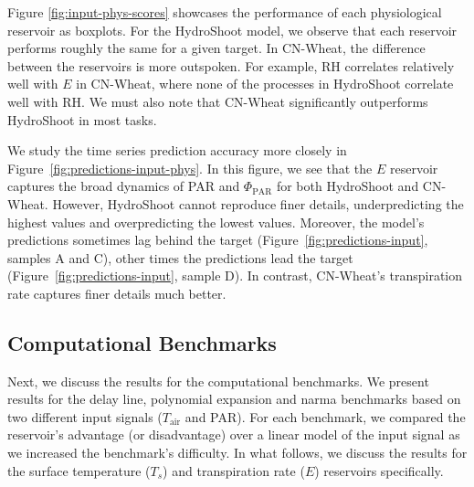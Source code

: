 Figure \ref{fig:input-phys-scores} showcases the performance of each physiological reservoir as boxplots.
For the HydroShoot model, we observe that each reservoir performs roughly the same for a given target.
In CN-Wheat, the difference between the reservoirs is more outspoken.
For example, RH correlates relatively well with $E$ in CN-Wheat, where none of the processes in HydroShoot correlate well with RH.
We must also note that CN-Wheat significantly outperforms HydroShoot in most tasks.




We study the time series prediction accuracy more closely in \mbox{Figure \ref{fig:predictions-input-phys}}.
In this figure, we see that the $E$ reservoir captures the broad dynamics of PAR and $\Phi_{\text{PAR}}$ for both HydroShoot and CN-Wheat.
However, HydroShoot cannot reproduce finer details, underpredicting the highest values and overpredicting the lowest values.
Moreover, the model's predictions sometimes lag behind the target (\mbox{Figure \ref{fig:predictions-input}}, samples A and C), other times the predictions lead the target (\mbox{Figure \ref{fig:predictions-input}}, sample D).
In contrast, CN-Wheat's transpiration rate captures finer details much better.



\subsection{Computational Benchmarks}

Next, we discuss the results for the computational benchmarks.
We present results for the delay line, polynomial expansion and \acrshort{narma} benchmarks based on two different input signals ($T_\text{air}$ and PAR).
For each benchmark, we compared the reservoir's advantage (or disadvantage) over a linear model of the input signal as we increased the benchmark's difficulty.
In what follows, we discuss the results for the surface temperature ($T_s$) and transpiration rate ($E$) reservoirs specifically.


